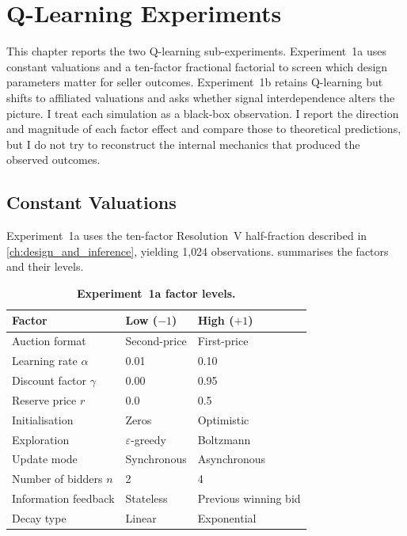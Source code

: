 \chapter{Q-Learning Experiments}
\label{ch:qlearning}

This chapter reports the two Q-learning sub-experiments. Experiment~1a uses constant valuations and a ten-factor fractional factorial to screen which design parameters matter for seller outcomes. Experiment~1b retains Q-learning but shifts to affiliated valuations and asks whether signal interdependence alters the picture. I treat each simulation as a black-box observation. I report the direction and magnitude of each factor effect and compare those to theoretical predictions, but I do not try to reconstruct the internal mechanics that produced the observed outcomes.

\section{Constant Valuations}
\label{sec:exp1a_results}

Experiment~1a uses the ten-factor Resolution~V half-fraction described in \cref{ch:design_and_inference}, yielding 1{,}024 observations.  summarises the factors and their levels.

\begin{table}[H]
\centering
\caption[Experiment~1a factor levels]{\textbf{Experiment~1a factor levels.}}
\label{tab:exp1a_params_summary}
\begin{tabular}{l l l}
\toprule
\textbf{Factor} & \textbf{Low} ($-1$) & \textbf{High} ($+1$)\\
\midrule
Auction format & Second-price & First-price \\
Learning rate $\alpha$ & 0.01 & 0.10 \\
Discount factor $\gamma$ & 0.00 & 0.95 \\
Reserve price $r$ & 0.0 & 0.5 \\
Initialisation & Zeros & Optimistic \\
Exploration & $\varepsilon$-greedy & Boltzmann \\
Update mode & Synchronous & Asynchronous \\
Number of bidders $n$ & 2 & 4 \\
Information feedback & Stateless & Previous winning bid \\
Decay type & Linear & Exponential \\
\bottomrule
\end{tabular}
\end{table}

